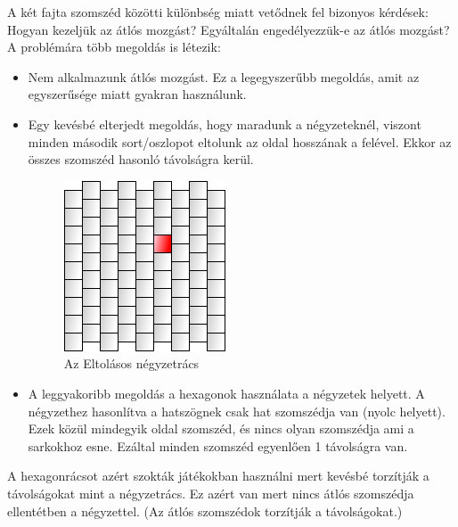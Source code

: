 \noindent A két fajta szomszéd közötti különbség miatt vetődnek fel bizonyos kérdések:
\newline
\newline Hogyan kezeljük az átlós mozgást? 
\newline Egyáltalán engedélyezzük-e az átlós mozgást? 
\newline
\newline A problémára több megoldás is létezik:

\begin{itemize}
\item Nem alkalmazunk átlós mozgást. Ez a legegyszerűbb megoldás, amit az egyszerűsége miatt gyakran használunk.
\item Egy kevésbé elterjedt megoldás, hogy maradunk a négyzeteknél, viszont minden második sort/oszlopot eltolunk az oldal hosszának a felével. Ekkor az összes szomszéd hasonló távolságra kerül.

\begin{figure}[h]
\centering
\includegraphics[scale=0.4]{kepek/img22.png}
\caption{Az Eltolásos négyzetrács}
\label{fig:img22}
\end{figure}

\item A leggyakoribb megoldás a hexagonok használata a négyzetek helyett. A négyzethez hasonlítva a hatszögnek csak hat szomszédja van (nyolc helyett). Ezek közül mindegyik oldal szomszéd, és nincs olyan szomszédja ami a sarkokhoz esne. Ezáltal minden szomszéd egyenlően 1 távolságra van.
\end{itemize}

\noindent A hexagonrácsot azért szokták játékokban használni mert kevésbé torzítják a távolságokat mint a négyzetrács. Ez azért van mert nincs átlós szomszédja ellentétben a négyzettel. (Az átlós szomszédok torzítják a távolságokat.)

